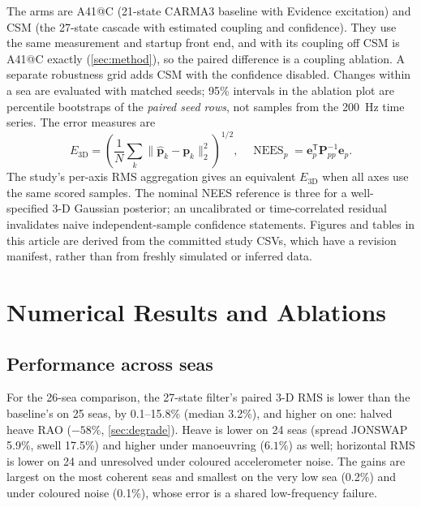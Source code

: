 \documentclass[conference]{IEEEtran}
\newcommand{\vct}[1]{\bm{#1}}
\newcommand{\mat}[1]{\bm{#1}}
\newcommand{\T}{^{\mathsf T}}
\newcommand{\InputPart}[1]{}
\begin{document}
The arms are A41@C (21-state CARMA3 baseline with Evidence excitation) and
CSM (the 27-state cascade with estimated coupling and confidence). They use
the same measurement and startup front end, and with its coupling off CSM is
A41@C exactly (\cref{sec:method}), so the paired difference is a coupling
ablation. A separate robustness grid adds CSM with the confidence disabled.
Changes within a sea are evaluated with matched seeds; 95\% intervals in
the ablation plot are percentile bootstraps of the \emph{paired seed rows},
not samples from the \SI{200}{Hz} time series. The error measures are
\begin{equation}
 E_{3\mathrm D}=\left(\frac1N\sum_k
 \|\hat{\vct p}_k-\vct p_k\|_2^2\right)^{1/2},\quad
 \operatorname{NEES}_p=\vct e_p\T\mat P_{pp}^{-1}\vct e_p.
 \label{eq:metrics}
\end{equation}
The study's per-axis RMS aggregation gives an equivalent $E_{3\mathrm D}$
when all axes use the same scored samples. The nominal NEES reference is
three for a well-specified 3-D Gaussian posterior; an uncalibrated or
time-correlated residual invalidates naive independent-sample confidence
statements. Figures and tables in this article are derived from the
committed study CSVs, which have a revision manifest, rather than from
freshly simulated or inferred data.

\section{Numerical Results and Ablations}
\label{sec:results}
\subsection{Performance across seas}
For the 26-sea comparison, the 27-state filter's paired 3-D RMS is lower
than the baseline's on 25 seas, by 0.1--15.8\% (median 3.2\%), and higher on
one: halved heave RAO ($-58\%$, \cref{sec:degrade}). Heave is lower on 24
seas (spread JONSWAP 5.9\%, swell 17.5\%) and higher under manoeuvring
($6.1\%$) as well; horizontal RMS is lower on 24 and unresolved under
coloured accelerometer noise. The gains are largest on the most coherent
seas and smallest on the very low sea (0.2\%) and under coloured noise
(0.1\%), whose error is a shared low-frequency failure.

\begin{table}[!t]
\caption{Mean of scenario-level paired percentage improvements of the
27-state filter relative to A41, with the range over the group's seas.
Positive means \emph{smaller} RMS; there are 9 fixed, 6 coupling, 1 gradual,
3 rapid and 7 disturbed seas.}
\label{tab:groups}
\centering\footnotesize
\resizebox{\columnwidth}{!}{\InputPart{csm-groups.tex-part}}
\end{table}
\end{document}

